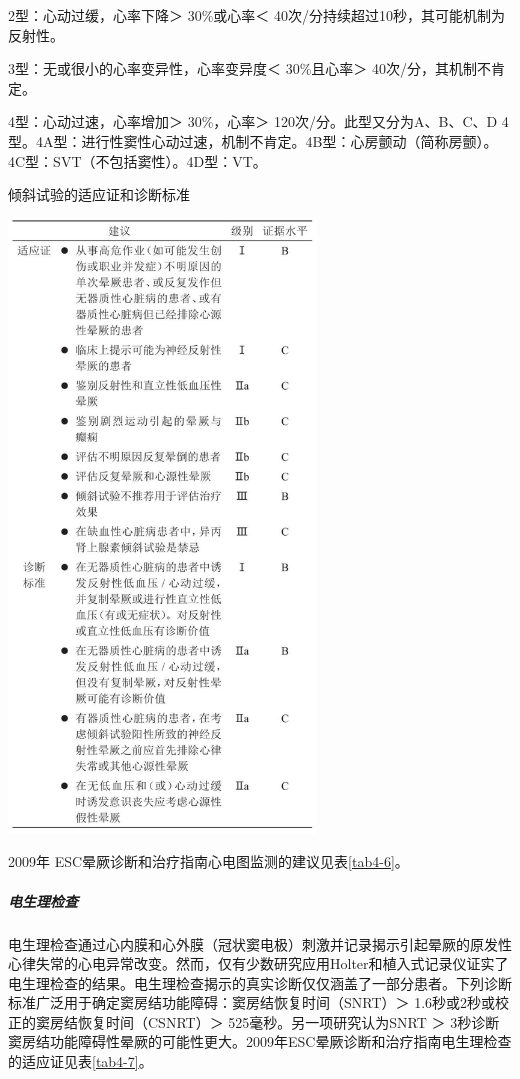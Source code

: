 2型：心动过缓，心率下降＞ 30\%或心率＜
40次/分持续超过10秒，其可能机制为反射性。

3型：无或很小的心率变异性，心率变异度＜ 30\%且心率＞
40次/分，其机制不肯定。

4型：心动过速，心率增加＞ 30\%，心率＞ 120次/分。此型又分为A、B、C、D
4型。4A型：进行性窦性心动过速，机制不肯定。4B型：心房颤动（简称房颤）。4C型：SVT（不包括窦性）。4D型：VT。

\begin{table}[htbp]
\centering
\caption{倾斜试验的适应证和诊断标准}
\label{tab4-5}
\includegraphics[width=3.21875in,height=6.40625in]{./images/Image00022.jpg}
\end{table}

2009年 ESC晕厥诊断和治疗指南心电图监测的建议见表\ref{tab4-6}。

\subparagraph{电生理检查}

电生理检查通过心内膜和心外膜（冠状窦电极）刺激并记录揭示引起晕厥的原发性心律失常的心电异常改变。然而，仅有少数研究应用Holter和植入式记录仪证实了电生理检查的结果。电生理检查揭示的真实诊断仅仅涵盖了一部分患者。下列诊断标准广泛用于确定窦房结功能障碍：窦房结恢复时间（SNRT）＞
1.6秒或2秒或校正的窦房结恢复时间（CSNRT）＞ 525毫秒。另一项研究认为SNRT
＞
3秒诊断窦房结功能障碍性晕厥的可能性更大。2009年ESC晕厥诊断和治疗指南电生理检查的适应证见表\ref{tab4-7}。

